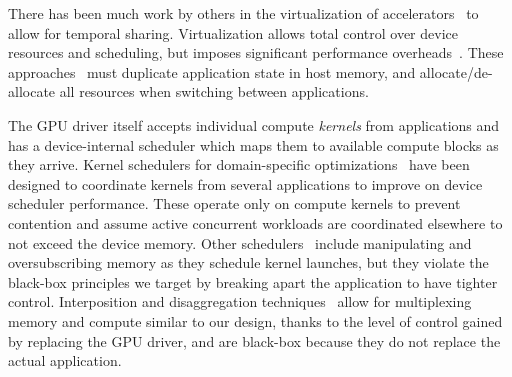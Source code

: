 There has been much work by others in the virtualization of accelerators~\cite{duato2010rcuda, yu2019automatic, hong2017gpu} to allow for temporal sharing.
Virtualization allows total control over device resources and scheduling, but imposes significant performance overheads~\cite{yu2017full}.
These approaches~\cite{yu2019automatic, hong2017gpu} must duplicate application state in host memory, and allocate/de-allocate all resources when switching between applications.


The GPU driver itself accepts individual compute \emph{kernels} from applications and has a device-internal scheduler which maps them to available compute blocks as they arrive.
Kernel schedulers for domain-specific optimizations~\cite{strati2024orion,chen2017effisha,kim2020navigator,gu2023fast} have been designed to coordinate kernels from several applications to improve on device scheduler performance.
These operate only on compute kernels to prevent contention and assume active concurrent workloads are coordinated elsewhere to not exceed the device memory.
Other schedulers~\cite{ng2023paella,pemberton2022kernel,strati2024orion} include manipulating and oversubscribing memory as they schedule kernel launches, but they violate the black-box principles we target by breaking apart the application to have tighter control.
Interposition and disaggregation techniques~\cite{fingler2022dgsf,duato2010rcuda} allow for multiplexing memory and compute similar to our design, thanks to the level of control gained by replacing the GPU driver, and are black-box because they do not replace the actual application.


